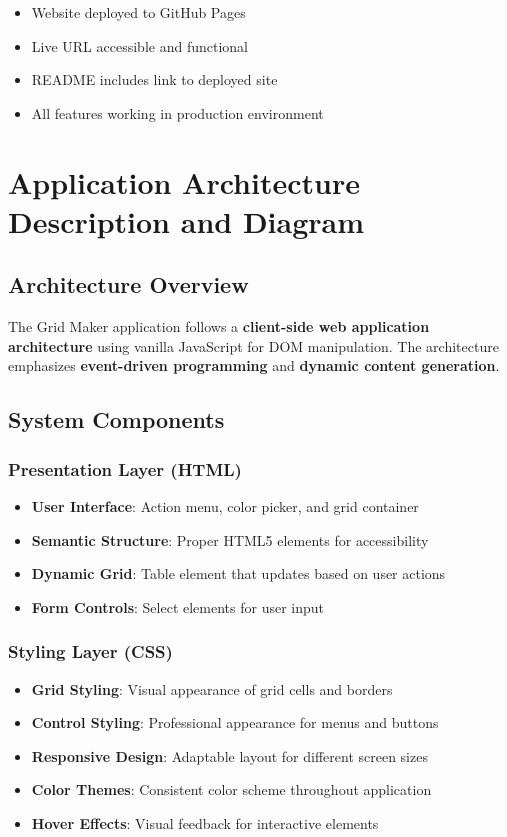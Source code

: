 \documentclass[11pt,a4paper]{article}
\begin{document}
\begin{itemize}[leftmargin=*]
    \item Website deployed to GitHub Pages
    \item Live URL accessible and functional
    \item README includes link to deployed site
    \item All features working in production environment
\end{itemize}

\section{Application Architecture Description and Diagram}

\subsection{Architecture Overview}

The Grid Maker application follows a \textbf{client-side web application architecture} using vanilla JavaScript for DOM manipulation. The architecture emphasizes \textbf{event-driven programming} and \textbf{dynamic content generation}.

\subsection{System Components}

\subsubsection{Presentation Layer (HTML)}
\begin{itemize}[leftmargin=*]
    \item \textbf{User Interface}: Action menu, color picker, and grid container
    \item \textbf{Semantic Structure}: Proper HTML5 elements for accessibility
    \item \textbf{Dynamic Grid}: Table element that updates based on user actions
    \item \textbf{Form Controls}: Select elements for user input
\end{itemize}

\subsubsection{Styling Layer (CSS)}
\begin{itemize}[leftmargin=*]
    \item \textbf{Grid Styling}: Visual appearance of grid cells and borders
    \item \textbf{Control Styling}: Professional appearance for menus and buttons
    \item \textbf{Responsive Design}: Adaptable layout for different screen sizes
    \item \textbf{Color Themes}: Consistent color scheme throughout application
    \item \textbf{Hover Effects}: Visual feedback for interactive elements
\end{itemize}
\end{document}
